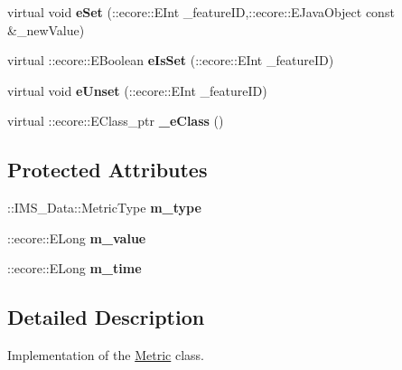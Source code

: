 \begin{DoxyCompactItemize}
\item 
\hypertarget{classIMS__Data_1_1Metric_a1ac5455c97790c22cef29fec7c910a21}{
virtual void {\bfseries eSet} (::ecore::EInt \_\-featureID,::ecore::EJavaObject const \&\_\-newValue)}
\label{classIMS__Data_1_1Metric_a1ac5455c97790c22cef29fec7c910a21}

\item 
\hypertarget{classIMS__Data_1_1Metric_a9a2363e84832e0a1590e73adcf5c16d4}{
virtual ::ecore::EBoolean {\bfseries eIsSet} (::ecore::EInt \_\-featureID)}
\label{classIMS__Data_1_1Metric_a9a2363e84832e0a1590e73adcf5c16d4}

\item 
\hypertarget{classIMS__Data_1_1Metric_afd59d79fcea17e464b099d060ed95218}{
virtual void {\bfseries eUnset} (::ecore::EInt \_\-featureID)}
\label{classIMS__Data_1_1Metric_afd59d79fcea17e464b099d060ed95218}

\item 
\hypertarget{classIMS__Data_1_1Metric_aa0d7fb9e77d195cf73a25d69817230e8}{
virtual ::ecore::EClass\_\-ptr {\bfseries \_\-eClass} ()}
\label{classIMS__Data_1_1Metric_aa0d7fb9e77d195cf73a25d69817230e8}

\end{DoxyCompactItemize}
\subsection*{Protected Attributes}
\begin{DoxyCompactItemize}
\item 
\hypertarget{classIMS__Data_1_1Metric_ab5bae44956a79bfa823a2d6c43a63c31}{
::IMS\_\-Data::MetricType {\bfseries m\_\-type}}
\label{classIMS__Data_1_1Metric_ab5bae44956a79bfa823a2d6c43a63c31}

\item 
\hypertarget{classIMS__Data_1_1Metric_ab2260d716939c0dba41dbc7c4edfa156}{
::ecore::ELong {\bfseries m\_\-value}}
\label{classIMS__Data_1_1Metric_ab2260d716939c0dba41dbc7c4edfa156}

\item 
\hypertarget{classIMS__Data_1_1Metric_ad67abee44866e6a6d38318ecd739d73c}{
::ecore::ELong {\bfseries m\_\-time}}
\label{classIMS__Data_1_1Metric_ad67abee44866e6a6d38318ecd739d73c}

\end{DoxyCompactItemize}


\subsection{Detailed Description}
Implementation of the \hyperlink{classIMS__Data_1_1Metric}{Metric} class. 

